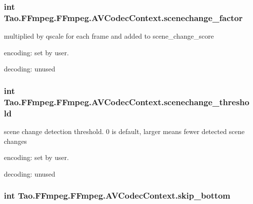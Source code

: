 \label{struct_tao_1_1_f_fmpeg_1_1_f_fmpeg_1_1_a_v_codec_context_af87b640341719b6a8ad693a314d00e51}
\hypertarget{struct_tao_1_1_f_fmpeg_1_1_f_fmpeg_1_1_a_v_codec_context_ae9718cbc8f828aada8c5ef0a9377c13b}{
\subsubsection[{scenechange\_\-factor}]{\setlength{\rightskip}{0pt plus 5cm}int {\bf Tao.FFmpeg.FFmpeg.AVCodecContext.scenechange\_\-factor}}}
\label{struct_tao_1_1_f_fmpeg_1_1_f_fmpeg_1_1_a_v_codec_context_ae9718cbc8f828aada8c5ef0a9377c13b}
multiplied by qscale for each frame and added to scene\_\-change\_\-score
\begin{DoxyItemize}
\item encoding: set by user.
\item decoding: unused 
\end{DoxyItemize}\hypertarget{struct_tao_1_1_f_fmpeg_1_1_f_fmpeg_1_1_a_v_codec_context_acf6e5904b9bd1d178aef0952f0862e83}{
\subsubsection[{scenechange\_\-threshold}]{\setlength{\rightskip}{0pt plus 5cm}int {\bf Tao.FFmpeg.FFmpeg.AVCodecContext.scenechange\_\-threshold}}}
\label{struct_tao_1_1_f_fmpeg_1_1_f_fmpeg_1_1_a_v_codec_context_acf6e5904b9bd1d178aef0952f0862e83}
scene change detection threshold. 0 is default, larger means fewer detected scene changes
\begin{DoxyItemize}
\item encoding: set by user.
\item decoding: unused 
\end{DoxyItemize}\hypertarget{struct_tao_1_1_f_fmpeg_1_1_f_fmpeg_1_1_a_v_codec_context_ac58332fd0b490e059d21d2fada767f25}{
\subsubsection[{skip\_\-bottom}]{\setlength{\rightskip}{0pt plus 5cm}int {\bf Tao.FFmpeg.FFmpeg.AVCodecContext.skip\_\-bottom}}}
